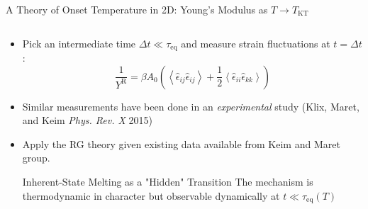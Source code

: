 \begin{frame}{A Theory of Onset Temperature in 2D: Young's Modulus as $T \to T_\mathrm{KT}$}
\begin{columns}
\begin{column}[T]{0.575\textwidth}
\begin{itemize}
    \item<2->Pick an intermediate time $\Delta t \ll \tau_\mathrm{eq}$ and measure strain fluctuations at $t = \Delta t$:
    \begin{equation*}
    \frac{1}{Y^\mathrm{R}} = \beta A_0 \left(\left\langle\hat{\epsilon}_{i j} \hat{\epsilon}_{i j}\right\rangle+\frac{1}{2}\left\langle\hat{\epsilon}_{i i}\hat{\epsilon}_{k k}\right\rangle\right)
    \end{equation*}
    \item<5-> Similar measurements have been done in an \textit{experimental} study (Klix, Maret, and Keim \textit{Phys. Rev. X} 2015)
    \vspace{-18pt}
    \item<14-> Apply the RG theory given existing data available from Keim and Maret group.
    \begin{block}{\centering Inherent-State Melting as a "Hidden" Transition}
    \vspace{5pt}
    \centering The mechanism is thermodynamic in character but observable dynamically at $t \ll \tau_\mathrm{eq}(T)$
    \vspace{5pt}
    \end{block}

\end{itemize}


\end{column}

\end{columns}  
\end{frame}